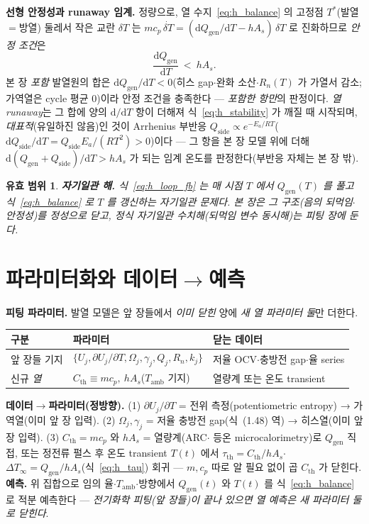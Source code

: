 \documentclass[11pt,a4paper]{article}
\newtheorem*{boundbox}{유효 범위}
\newcommand{\dd}{\mathrm{d}}
\newcommand{\gen}{\mathrm{gen}}
\newcommand{\amb}{\mathrm{amb}}
\newcommand{\Th}{\mathrm{th}}
\begin{document}
\textbf{선형 안정성과 runaway 임계.} 정량으로, 열 수지~\eqref{eq:h_balance} 의 고정점 $T^\ast$(발열$=$방열) 둘레서
작은 교란 $\delta T$ 는 $mc_p\,\dot{\delta T}=(\dd Q_\gen/\dd T-hA_s)\,\delta T$ 로 진화하므로 \emph{안정 조건}은
\begin{equation}
\frac{\dd Q_\gen}{\dd T}\ <\ hA_s.
\label{eq:h_stability}
\end{equation}
본 장 \emph{포함} 발열원의 합은 $\dd Q_\gen/\dd T<0$(히스 gap$\cdot$완화 소산$\cdot$$R_n(T)$ 가 가열서 감소; 가역열은
cycle 평균 $0$)이라 안정 조건을 충족한다 — \emph{포함한 항만}의 판정이다. \emph{열 runaway}는 그 합에 양의
$\dd/\dd T$ 항이 더해져 식~\eqref{eq:h_stability} 가 깨질 때 시작되며, \emph{대표적}(유일하진 않음)인 것이
Arrhenius 부반응 $Q_\mathrm{side}\propto e^{-E_a/RT}$($\dd Q_\mathrm{side}/\dd T=Q_\mathrm{side}E_a/(RT^2)>0$)이다 —
그 항을 본 장 모델 위에 더해 $\dd(Q_\gen+Q_\mathrm{side})/\dd T>hA_s$ 가 되는 임계 온도를 판정한다(부반응 자체는
본 장 밖).
\begin{boundbox}
\textbf{자기일관 해.} 식~\eqref{eq:h_loop_fb} 는 매 시점 $T$ 에서 $Q_\gen(T)$ 를 풀고 식~\eqref{eq:h_balance} 로
$T$ 를 갱신하는 \emph{자기일관} 문제다. 본 장은 그 \emph{구조}(음의 되먹임$\cdot$안정성)를 정성으로 닫고, 정식
자기일관 수치해(되먹임 변수 동시해)는 피팅 장에 둔다.
\end{boundbox}

\section{파라미터화와 데이터$\to$예측}\label{sec:h_param}
\textbf{피팅 파라미터.} 발열 모델은 앞 장들에서 \emph{이미 닫힌} 양에 \emph{새 열 파라미터 둘}만 더한다.
\begin{center}
\renewcommand{\arraystretch}{1.3}
\begin{tabular}{p{} p{} p{}}
\toprule
구분 & 파라미터 & 닫는 데이터 \\
\midrule
앞 장들 기지 & $\{U_j,\partial U_j/\partial T,\Omega_j,\gamma_j,Q_j,R_n,k_j\}$ & 저율 OCV$\cdot$충방전 gap$\cdot$율 series \\
신규 \emph{열} & $C_\Th\!\equiv\!mc_p,\ hA_s$($T_\amb$ 기지) & 열량계 또는 온도 transient \\
\bottomrule
\end{tabular}
\end{center}
\textbf{데이터$\to$파라미터(정방향).} (1) $\partial U_j/\partial T$ = 전위 측정(potentiometric entropy) → 가역열(이미
앞 장 입력). (2) $\Omega_j,\gamma_j$ = 저율 충방전 gap(식~(1.48) 역) → 히스열(이미 앞 장 입력). (3) $C_\Th\!=\!mc_p$ 와 $hA_s$ = 열량계(ARC$\cdot$
등온 microcalorimetry)로 $Q_\gen$ 직접, 또는 정전류 펄스 후 온도 transient $T(t)$ 에서 $\tau_\Th=C_\Th/hA_s$$\cdot$
$\Delta T_\infty=Q_\gen/hA_s$(식~\eqref{eq:h_tau}) 회귀 — $m,c_p$ 따로 알 필요 없이 곱 $C_\Th$ 가 닫힌다.
\textbf{예측.} 위 집합으로 임의 율$\cdot$$T_\amb$$\cdot$방향에서 $Q_\gen(t)$ 와 $T(t)$ 를 식~\eqref{eq:h_balance} 로
적분 예측한다 — \emph{전기화학 피팅(앞 장들)이 끝나 있으면 열 예측은 새 파라미터 둘로 닫힌다}.
\end{document}
